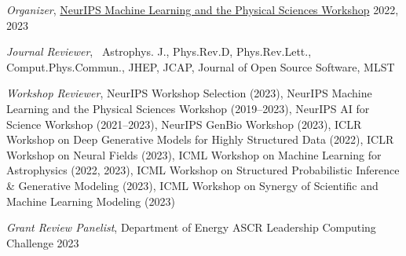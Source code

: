 \documentclass[letterpaper,11pt]{article}
\newenvironment{packed_itemize}{
\begin{itemize}[label=\raisebox{0.25ex}{\tiny$\bullet$}]
  \setlength{\itemsep}{4.2pt}
  \setlength{\parskip}{0pt}
  \setlength{\parsep}{0pt}}{\end{itemize}
}
\begin{document}
\begin{packed_itemize}
  \item \emph{Organizer}, \href{https://ml4physicalsciences.github.io/}{NeurIPS Machine Learning and the Physical Sciences Workshop} \hfill 2022, 2023
  \item \emph{Journal Reviewer}, \ \scriptsize{Astrophys. J., Phys.Rev.{D}, Phys.Rev.Lett., Comput.Phys.Commun., JHEP,  JCAP, Journal of Open Source Software, MLST}\normalsize
  \item \emph{Workshop Reviewer}, \scriptsize{NeurIPS Workshop Selection (2023), NeurIPS Machine Learning and the Physical Sciences Workshop (2019--2023), NeurIPS AI for Science Workshop (2021--2023), NeurIPS GenBio Workshop (2023), ICLR Workshop on Deep Generative Models for Highly Structured Data (2022), ICLR Workshop on Neural Fields (2023), ICML Workshop on Machine Learning for Astrophysics (2022, 2023), ICML Workshop on Structured Probabilistic Inference \& Generative Modeling (2023), ICML Workshop on Synergy of Scientific and Machine Learning Modeling (2023)}\normalsize
  \item \emph{Grant Review Panelist}, Department of Energy ASCR Leadership Computing Challenge \hfill 2023

\end{packed_itemize}
\end{document}
